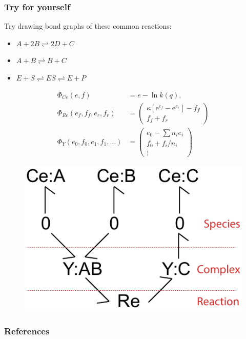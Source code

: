 \documentclass[10pt,reqno]{beamer}
\newcommand{\e}{\mathrm{e}}
\begin{document}
\begin{frame}
\frametitle{Try for yourself}
Try drawing bond graphs of these common reactions:
\begin{itemize}
	\item $A+2B \rightleftharpoons 2D+C$
	\item $A+B \rightleftharpoons B+C$
	\item $E + S \rightleftharpoons ES \rightleftharpoons E+P$
\end{itemize}
\vfill
{\scriptsize
	\begin{minipage}{0.475\textwidth}
		\begin{align*}
		\Phi_{Ce}(e,f) &= e - \ln k(q),\\
		\Phi_{Re}(e_f,f_f,e_r,f_r) &= \left(
		\begin{matrix}
		\kappa\left[\e^{e_f} - \e^{e_r}\right] - f_f\\
		f_f +  f_r
		\end{matrix}
		\right)\\
		\Phi_{Y}(e_0,f_0, e_1,f_1,\ldots) &= \left(\begin{matrix}
		e_0 - \sum n_ie_i \\
		f_0 + f_i/n_i\\
		\vdots
		\end{matrix}\right)
		\end{align*}
	\end{minipage}
\begin{minipage}{0.475\textwidth}
	\raggedright
	\begin{figure}
	\includegraphics[width=0.75\linewidth]{images/bondgraph_abc}
	\end{figure}
\end{minipage}
}
\end{frame}
\begin{frame}
\frametitle{References}
\printbibliography
\end{frame}
\end{document}
